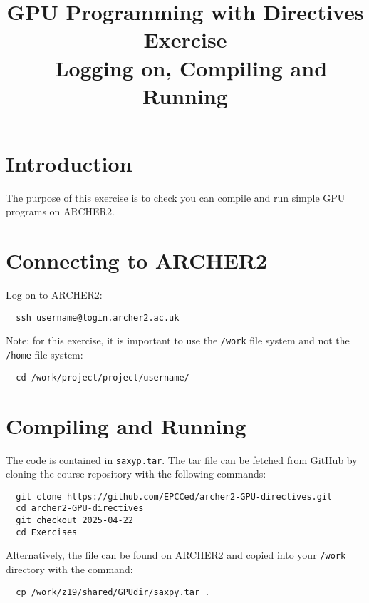 \documentclass{article}
\begin{document}
\title{GPU Programming with Directives Exercise \\\
  Logging on, Compiling and Running}

\author{}
\date{}

\maketitle

\section{Introduction}

The purpose of this exercise is to check you can compile and run
simple GPU programs on ARCHER2.

\section{Connecting to ARCHER2}

Log on to ARCHER2:
\begin{verbatim}
  ssh username@login.archer2.ac.uk
\end{verbatim}

\noindent Note: for this exercise, it is important to use the \texttt{/work}
file system and not the \texttt{/home} file system:

\begin{verbatim}
  cd /work/project/project/username/
\end{verbatim}

\section{Compiling and Running}
The code is contained in \texttt{saxyp.tar}. The tar file can be fetched from GitHub by
cloning the course repository with the following commands:

\begin{verbatim}
  git clone https://github.com/EPCCed/archer2-GPU-directives.git
  cd archer2-GPU-directives
  git checkout 2025-04-22
  cd Exercises
\end{verbatim}

\noindent Alternatively, the file can be found on ARCHER2 and copied into your
\texttt{/work} directory with the command:

\begin{verbatim}
  cp /work/z19/shared/GPUdir/saxpy.tar .
\end{verbatim}
\end{document}
